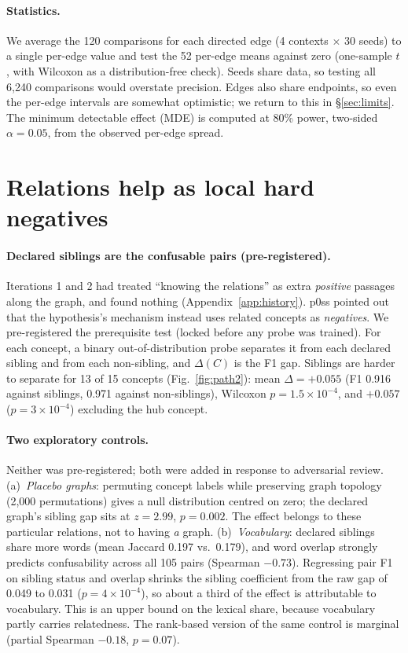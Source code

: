\documentclass[11pt]{article}
\begin{document}
\paragraph{Statistics.} We average the 120 comparisons for each directed edge (4 contexts $\times$ 30 seeds) to a
single per-edge value and test the 52 per-edge means against zero (one-sample $t$, with Wilcoxon as a
distribution-free check). Seeds share data, so testing all 6,240 comparisons would overstate precision. Edges
also share endpoints, so even the per-edge intervals are somewhat optimistic; we return to this in
\S\ref{sec:limits}. The minimum detectable effect (MDE) is computed at 80\% power, two-sided $\alpha=0.05$, from
the observed per-edge spread.

\section{Relations help as local hard negatives}
\label{sec:local}

\paragraph{Declared siblings are the confusable pairs (pre-registered).} Iterations 1 and 2 had treated
``knowing the relations'' as extra \emph{positive} passages along the graph, and found nothing
(Appendix~\ref{app:history}). p0ss pointed out that the hypothesis's mechanism instead uses related concepts as
\emph{negatives}. We pre-registered the prerequisite test (locked before any probe was trained). For each concept,
a binary out-of-distribution probe separates it from each declared sibling and from each non-sibling, and
$\Delta(C)$ is the F1 gap. Siblings are harder to separate for 13 of 15 concepts (Fig.~\ref{fig:path2}): mean
$\Delta = +0.055$ (F1 0.916 against siblings, 0.971 against non-siblings), Wilcoxon $p = 1.5\times 10^{-4}$, and
$+0.057$ ($p=3\times10^{-4}$) excluding the hub concept.

\paragraph{Two exploratory controls.} Neither was pre-registered; both were added in response to adversarial
review. (a)~\emph{Placebo graphs}: permuting concept labels while preserving graph topology (2,000 permutations)
gives a null distribution centred on zero; the declared graph's sibling gap sits at $z=2.99$, $p=0.002$. The
effect belongs to these particular relations, not to having \emph{a} graph. (b)~\emph{Vocabulary}: declared
siblings share more words (mean Jaccard 0.197 vs.\ 0.179), and word overlap strongly predicts confusability
across all 105 pairs (Spearman $-0.73$). Regressing pair F1 on sibling status and overlap shrinks the sibling
coefficient from the raw gap of 0.049 to 0.031 ($p=4\times10^{-4}$), so about a third of the effect is
attributable to vocabulary. This is an upper bound on the lexical share, because vocabulary partly carries
relatedness. The rank-based version of the same control is marginal (partial Spearman $-0.18$, $p=0.07$).
\end{document}
